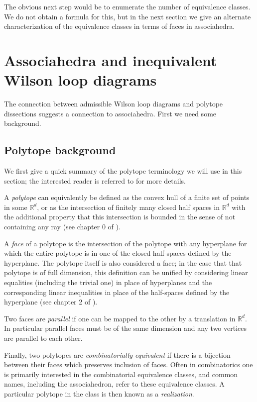 \documentclass[11pt]{article}
\newcommand{\sanote}{\todo[color=violet!30]}
\theoremstyle{remark}
\theoremstyle{definition}
\begin{document}
The obvious next step would be to enumerate the number of equivalence classes.  We do not obtain a formula for this, but in the next section we give an alternate characterization of the equivalence classes in terms of faces in associahedra.

\section{Associahedra and inequivalent Wilson loop diagrams}\label{sec associahedron}

The connection between admissible Wilson loop diagrams and polytope dissections suggests a connection to associahedra. First we need some background. \sanote{expand}

\subsection{Polytope background}\label{sec polytope background}

We first give a quick summary of the polytope terminology we will use in this section; the interested reader is referred to \cite{Ziegler} for more details.

A \emph{polytope} can equivalently be defined as the convex hull of a finite set of points in some $\mathbb{R}^d$, or as the intersection of finitely many closed half spaces in $\mathbb{R}^d$ with the additional property that this intersection is bounded in the sense of not containing any ray (see chapter 0 of \cite{Ziegler}).

A \emph{face} of a polytope is the intersection of the polytope with any hyperplane for which the entire polytope is in one of the closed half-spaces defined by the hyperplane.  The polytope itself is also considered a face; in the case that that polytope is of full dimension, this definition can be unified by considering linear equalities (including the trivial one) in place of hyperplanes and the corresponding linear inequalities in place of the half-spaces defined by the hyperplane (see chapter 2 of \cite{Ziegler}).  

Two faces are \emph{parallel} if one can be mapped to the other by a translation in $\mathbb{R}^d$.  In particular parallel faces must be of the same dimension and any two vertices are parallel to each other.

Finally, two polytopes are \emph{combinatorially equivalent} if there is a bijection between their faces which preserves inclusion of faces.  Often in combinatorics one is primarily interested in the combinatorial equivalence classes, and common names, including the associahedron, refer to these equivalence classes.  A particular polytope in the class is then known as a \emph{realization}.  
\end{document}
